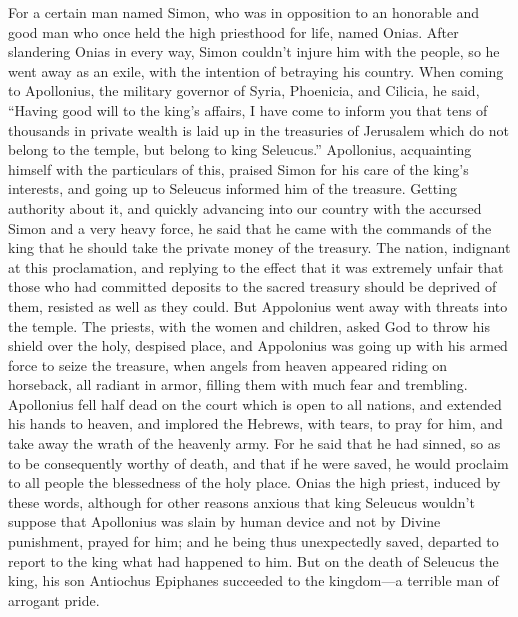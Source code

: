  For a certain man named Simon, who was in opposition to an
honorable and good man who once held the high priesthood for life, named
Onias. After slandering Onias in every way, Simon couldn't injure him
with the people, so he went away as an exile, with the intention of
betraying his country.  When coming to Apollonius, the
military governor of Syria, Phoenicia, and Cilicia, he said,
 ``Having good will to the king's affairs, I have come to
inform you that tens of thousands in private wealth is laid up in the
treasuries of Jerusalem which do not belong to the temple, but belong to
king Seleucus.''  Apollonius, acquainting himself with the
particulars of this, praised Simon for his care of the king's interests,
and going up to Seleucus informed him of the treasure. 
Getting authority about it, and quickly advancing into our country with
the accursed Simon and a very heavy force,  he said that he
came with the commands of the king that he should take the private money
of the treasury.  The nation, indignant at this
proclamation, and replying to the effect that it was extremely unfair
that those who had committed deposits to the sacred treasury should be
deprived of them, resisted as well as they could.  But
Appolonius went away with threats into the temple.  The
priests, with the women and children, asked God to throw his shield over
the holy, despised place,  and Appolonius was going up with
his armed force to seize the treasure, when angels from heaven appeared
riding on horseback, all radiant in armor, filling them with much fear
and trembling.  Apollonius fell half dead on the court
which is open to all nations, and extended his hands to heaven, and
implored the Hebrews, with tears, to pray for him, and take away the
wrath of the heavenly army.  For he said that he had
sinned, so as to be consequently worthy of death, and that if he were
saved, he would proclaim to all people the blessedness of the holy
place.  Onias the high priest, induced by these words,
although for other reasons anxious that king Seleucus wouldn't suppose
that Apollonius was slain by human device and not by Divine punishment,
prayed for him;  and he being thus unexpectedly saved,
departed to report to the king what had happened to him. 
But on the death of Seleucus the king, his son Antiochus Epiphanes
succeeded to the kingdom---a terrible man of arrogant pride.

